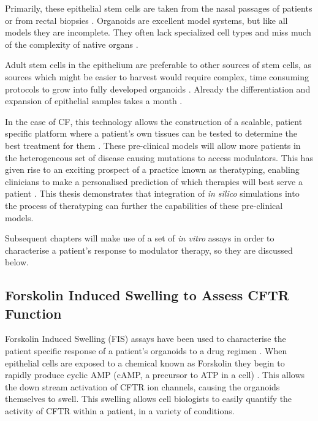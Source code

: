 Primarily, these epithelial stem cells are taken from the nasal passages of patients or from rectal biopsies \cite{}. Organoids are excellent model systems, but like all models they are incomplete. They often lack specialized cell types and miss much of the complexity of native organs \cite{clevers2016}. 

Adult stem cells in the epithelium are preferable to other sources of stem cells, as sources which might be easier to harvest would require complex, time consuming protocols to grow into fully developed organoids \cite{}. Already the differentiation and expansion of epithelial samples takes a month \cite{}.

In the case of CF, this technology allows the construction of a scalable, patient specific platform where a patient's own tissues can be tested to determine the best treatment for them \cite{}. These pre-clinical models will allow more patients in the heterogeneous set of disease causing mutations to access modulators. This has given rise to an exciting prospect of a practice known as theratyping, enabling clinicians to make a personalised prediction of which therapies will best serve a patient \cite{clancy2019, wong2022, wong2022a, ciciriello2022}. This thesis demonstrates that integration of \textit{in silico} simulations into the process of theratyping can further the capabilities of these pre-clinical models.

Subsequent chapters will make use of a set of \textit{in vitro} assays in order to characterise a patient's response to modulator therapy, so they are discussed below.

\subsection{Forskolin Induced Swelling to Assess CFTR Function}
Forskolin Induced Swelling (FIS) assays have been used to characterise the patient specific response of a patient's organoids to a drug regimen \cite{dekkers2013}. When epithelial cells are exposed to a chemical known as Forskolin they begin to rapidly produce cyclic AMP (cAMP, a precursor to ATP in a cell) \cite{}. This allows the down stream activation of CFTR ion channels, causing the organoids themselves to swell. This swelling allows cell biologists to easily quantify the activity of CFTR within a patient, in a variety of conditions.

